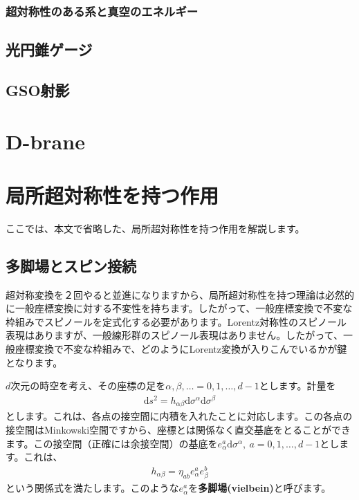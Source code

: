 \documentclass[report,paper=a4, fontsize=12pt, line_length=16cm, number_of_lines=33,dvipdfmx]{jlreq}
\numberwithin{equation}{chapter}
\numberwithin{equation}{section}
\newcommand{\kyou}[1]{{\sffamily \bfseries #1}}
\newcommand{\di}{\mathrm{d}}
\begin{document}
\subsection{超対称性のある系と真空のエネルギー}

\section{光円錐ゲージ}

\section{GSO射影}








\chapter{D-brane}


\appendix
\chapter{局所超対称性を持つ作用}
ここでは、本文で省略した、局所超対称性を持つ作用を解説します。

\section{多脚場とスピン接続}
超対称変換を２回やると並進になりますから、局所超対称性を持つ理論は必然的に一般座標変換に対する不変性を持ちます。したがって、一般座標変換で不変な枠組みでスピノールを定式化する必要があります。Lorentz対称性のスピノール表現はありますが、一般線形群のスピノール表現はありません。したがって、一般座標変換で不変な枠組みで、どのようにLorentz変換が入りこんでいるかが鍵となります。

$d$次元の時空を考え、その座標の足を$\alpha,\beta,\dots=0,1,\dots,d-1$とします。計量を
\begin{align}
  \di s^2 = h_{\alpha\beta} \di \sigma^{\alpha}\di \sigma^{\beta}
\end{align}
とします。これは、各点の接空間に内積を入れたことに対応します。この各点の接空間はMinkowski空間ですから、座標とは関係なく直交基底をとることができます。この接空間（正確には余接空間）の基底を$e^{a}_{\alpha}\di \sigma^{\alpha}, \ a=0,1,\dots,d-1$とします。これは、
\begin{align}
  h_{\alpha\beta}=\eta_{ab}e^{a}_{\alpha}e^{b}_{\beta}\label{vielbein}
\end{align}
という関係式を満たします。このような$e^{a}_{\alpha}$を\kyou{多脚場(vielbein)}と呼びます。
\end{document}
